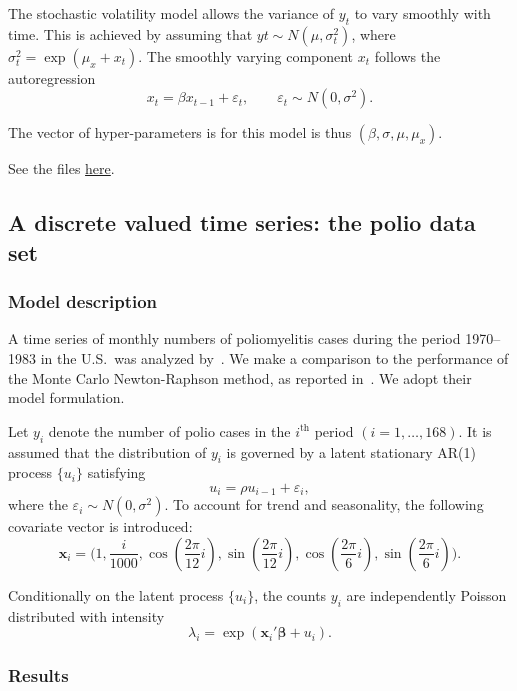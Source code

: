 \documentclass{admbmanual}
\newcommand{\citeasnoun}{\cite}
\begin{document}
The stochastic volatility model allows the variance of $y_t$ to vary smoothly
with time. This is achieved by assuming that $yt\sim N(\mu,\sigma_t^2)$, where
$\sigma_t^2=\exp(\mu_x+x_t)$. The smoothly varying component $x_t$ follows the
autoregression
\[
x_t = \beta x_{t-1} + \varepsilon_t, \qquad \varepsilon_t \sim N(0,\sigma^2).
\]

The vector of hyper-parameters is for this model is thus
$(\beta,\sigma,\mu,\mu_x)$.

See the files \href{http://otter-rsch.com/admbre/examples/sdv/sdv.html}{here}.

\subsection{A discrete valued time series: the polio data set}
\label{sec:sdv_example}

\subsubsection{Model description}

A time series of monthly numbers of poliomyelitis cases during the period
1970--1983 in the U.S.\ was analyzed by~\citeasnoun{zege:1988}. We make a
comparison to the performance of the Monte Carlo Newton-Raphson method, as
reported in~\citeasnoun{kuk:chen:1999}. We adopt their model formulation.

Let $y_i$ denote the number of polio cases in the $i^{\textrm{th}}$ period
$(i=1,\ldots,168)$. It is assumed that the distribution of $y_i$ is governed
by a latent stationary AR(1) process $\{u_i\}$ satisfying
\[
u_i = \rho u_{i-1} + \varepsilon_i,
\]
where the $\varepsilon_i\sim N(0,\sigma^2)$. %
To account for trend and seasonality, the following covariate vector is
introduced:
\[
\mathbf{x}_i = \Bigg(
1,
\frac{i}{1000},
\cos\left(\frac{2\pi}{12}i\right),
\sin\left(\frac{2\pi}{12}i\right),
\cos\left(\frac{2\pi}{6}i\right),
\sin\left(\frac{2\pi}{6}i\right)
\Bigg).
\]

Conditionally on the latent process $\{u_i\}$, the counts $y_i$ are
independently Poisson distributed with intensity
\[
\lambda_i=\exp(\mathbf{x}_i{}'\mathbf{\beta}+u_i).
\]

\subsubsection{Results}
\end{document}
